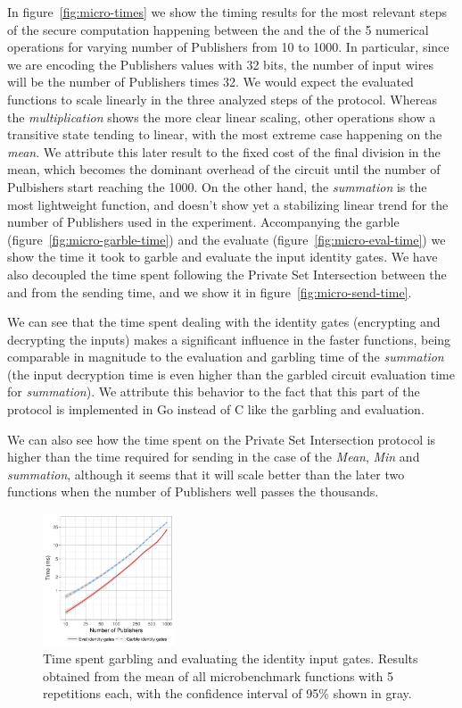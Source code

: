 In figure~\ref{fig:micro-times} we show the timing results for the most
relevant steps of the secure computation happening between the \broker and the
\garbler of the 5 numerical operations for varying number of Publishers from 10
to 1000.  In particular, since we are encoding the Publishers values with 32
bits, the number of input wires will be the number of Publishers times 32.  We
would expect the evaluated functions to scale linearly in the three analyzed
steps of the protocol.  Whereas the \emph{multiplication} shows the more clear
linear scaling, other operations show a transitive state tending to linear,
with the most extreme case happening on the \emph{mean}.  We attribute this
later result to the fixed cost of the final division in the mean, which becomes
the dominant overhead of the circuit until the number of Pulbishers start
reaching the 1000.  On the other hand, the \emph{summation} is the most
lightweight function, and doesn't show yet a stabilizing linear trend for the
number of Publishers used in the experiment.  Accompanying the garble
(figure~\ref{fig:micro-garble-time}) and the evaluate
(figure~\ref{fig:micro-eval-time}) we show the time it took to garble and
evaluate the input identity gates.  We have also decoupled the time spent
following the Private Set Intersection between the \broker and \garbler from
the sending time, and we show it in figure~\ref{fig:micro-send-time}.

We can see that the time spent dealing with the identity gates (encrypting and
decrypting the inputs) makes a significant influence in the faster functions,
being comparable in magnitude to the evaluation and garbling time of the
\emph{summation} (the input decryption time is even higher than the garbled
circuit evaluation time for \emph{summation}).  We attribute this behavior to
the fact that this part of the protocol is implemented in Go instead of C like
the garbling and evaluation.

We can also see how the time spent on the Private Set Intersection protocol is
higher than the time required for sending in the case of the \emph{Mean},
\emph{Min} and \emph{summation}, although it seems that it will scale better
than the later two functions when the number of Publishers well passes the
thousands.

\begin{figure}
  \includegraphics[width=0.35\textwidth]{plots/enc_dec.png}
  \caption{Time spent garbling and evaluating the identity input gates.
    Results obtained from the mean of all microbenchmark functions with 5
    repetitions each, with the confidence interval of 95\% shown in gray.}
  \label{micro-inputs}
\end{figure}

